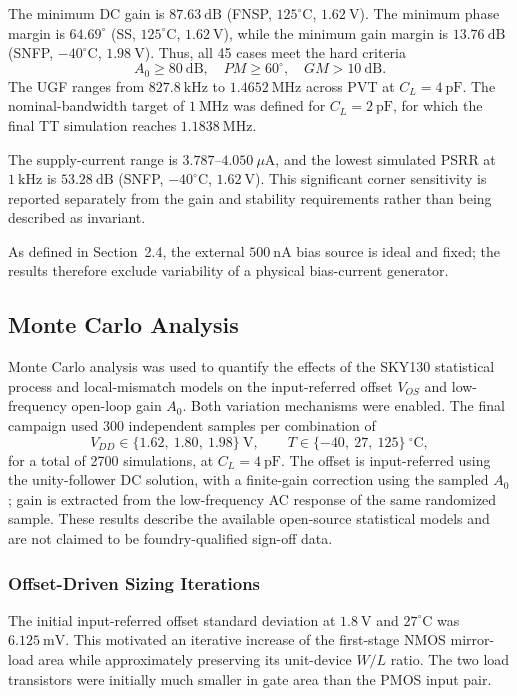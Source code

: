 The minimum DC gain is $87.63~\mathrm{dB}$ (FNSP,
$125^\circ\mathrm{C}$, $1.62~\mathrm{V}$). The minimum phase margin is
$64.69^\circ$ (SS, $125^\circ\mathrm{C}$, $1.62~\mathrm{V}$), while
the minimum gain margin is $13.76~\mathrm{dB}$ (SNFP,
$-40^\circ\mathrm{C}$, $1.98~\mathrm{V}$).
Thus, all 45 cases meet the hard criteria
\[
\boxed{A_0\ge80~\mathrm{dB},\quad
PM\ge60^\circ,\quad GM>10~\mathrm{dB}}.
\]
The UGF ranges from $827.8~\mathrm{kHz}$ to
$1.4652~\mathrm{MHz}$ across PVT at $C_L=4~\mathrm{pF}$. The
nominal-bandwidth target of $1~\mathrm{MHz}$ was defined for
$C_L=2~\mathrm{pF}$, for which the final TT simulation reaches
$1.1838~\mathrm{MHz}$.

The supply-current range is $3.787$--$4.050~\mu\mathrm{A}$, and the
lowest simulated PSRR at $1~\mathrm{kHz}$ is $53.28~\mathrm{dB}$
(SNFP, $-40^\circ\mathrm{C}$, $1.62~\mathrm{V}$). This significant
corner sensitivity is reported separately from the gain and stability
requirements rather than being described as invariant.

As defined in Section~2.4, the external $500~\mathrm{nA}$ bias source
is ideal and fixed; the results therefore exclude variability of a
physical bias-current generator.

\subsection{Monte Carlo Analysis}

Monte Carlo analysis was used to quantify the effects of the SKY130
statistical process and local-mismatch models on the input-referred
offset $V_{OS}$ and low-frequency open-loop gain $A_0$.
Both variation mechanisms were enabled. The final campaign used
300 independent samples per combination of
\[
V_{DD}\in\{1.62,\ 1.80,\ 1.98\}~\mathrm{V},\qquad
T\in\{-40,\ 27,\ 125\}~^\circ\mathrm{C},
\]
for a total of 2700 simulations, at $C_L=4~\mathrm{pF}$.
The offset is input-referred using the unity-follower DC solution,
with a finite-gain correction using the sampled $A_0$; gain is
extracted from the low-frequency AC response of the same randomized
sample. These results describe the available open-source statistical
models and are not claimed to be foundry-qualified sign-off data.

\subsubsection{Offset-Driven Sizing Iterations}

The initial input-referred offset standard deviation at
$1.8~\mathrm{V}$ and $27^\circ\mathrm{C}$ was
$6.125~\mathrm{mV}$. This motivated an iterative increase of the
first-stage NMOS mirror-load area while approximately preserving its
unit-device $W/L$ ratio. The two load transistors were initially much
smaller in gate area than the PMOS input pair.

